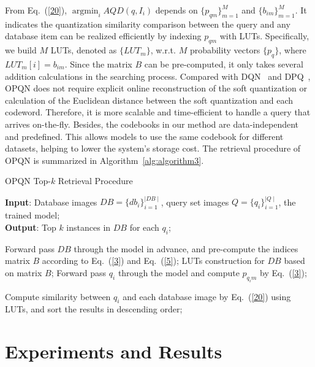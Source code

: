 \documentclass{elsarticle}
\DeclareMathOperator*{\argmin}{argmin}
\begin{document}
From Eq.~(\ref{20}), $\argmin_{i} AQD(q, I_{i})$ depends on $\{p_{qm}\}_{m=1}^M$ and $\{b_{im}\}_{m=1}^M$. It indicates the quantization similarity comparison between the query and any database item can be realized efficiently by indexing $p_{qm}$ with LUTs.
Specifically, we build $M$ LUTs, denoted as $\{LUT_m\}$, w.r.t. $M$ probability vectors $\{p_{q}\}$, where $LUT_m[i] = b_{im}$. Since the matrix $B$ can be pre-computed, it only takes several addition calculations in the searching process. Compared with DQN~\cite{cao2016deep} and DPQ~\cite{klein2019end}, OPQN does not require explicit online reconstruction of the soft quantization or calculation of the Euclidean distance between the soft quantization and each codeword. Therefore, it is more scalable and time-efficient to handle a query that arrives on-the-fly. Besides, the codebooks in our method are data-independent and predefined. This allows models to use the same codebook for different datasets, helping to lower the system's storage cost. The retrieval procedure of OPQN is summarized in Algorithm~\ref{alg:algorithm3}.

{\linespread{1.3}
\begin{algorithm}[htbp]
\caption{OPQN Top-$k$ Retrieval Procedure}
\label{alg:algorithm3}
\textbf{Input}: Database images $DB=\{db_i\}_{i=1}^{\mid DB\mid}$, query set images $Q=\{q_i\}_{i=1}^{\mid Q \mid}$, the trained model;\\
\textbf{Output}: Top $k$ instances in $DB$ for each $q_i$;
\begin{algorithmic}[1]
\State Forward pass $DB$ through the model in advance, and pre-compute the indices matrix $B$ according to Eq.~(\ref{3}) and Eq.~(\ref{5});
\State LUTs construction for $DB$ based on matrix $B$;
\State Forward pass $q_{i}$ through the model and compute $p_{q_{i}m}$ by Eq.~(\ref{3});
\State \parbox[t]{310pt}{Compute similarity between $q_i$ and each database image by Eq.~(\ref{20}) using LUTs, and sort the results in descending order;\strut}
\EndFor
\end{algorithmic}
\end{algorithm}
}

\section{Experiments and Results} \label{sec:4}
\end{document}
